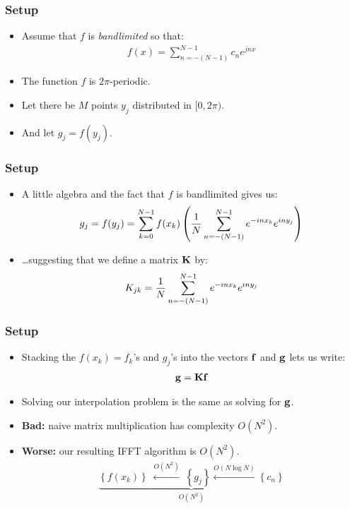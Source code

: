 \documentclass{beamer}
\newcommand{\parens}[1]{\left(#1\right)}
\newcommand{\set}[1]{\left\{#1\right\}}
\begin{document}
\begin{frame}
  \frametitle{Setup}
  \begin{itemize}
  \item Assume that $f$ is \emph{bandlimited} so that:
    \begin{align*}
      f(x) = \sum_{n=-(N-1)}^{N-1} c_n e^{jnx}
    \end{align*}
  \item The function $f$ is $2\pi$-periodic.
  \item Let there be $M$ points $y_j$ distributed in $[0, 2\pi)$.
  \item And let $g_j = f(y_j)$.
  \end{itemize}
\end{frame}

\begin{frame}
  \frametitle{Setup}
  \begin{itemize}
  \item A little algebra and the fact that $f$ is bandlimited gives us:
    \begin{align*}
      g_j = f(y_j) = \sum_{k=0}^{N-1} f(x_k) \parens{{1 \over N} \sum_{n=-(N-1)}^{N-1} e^{-inx_k} e^{iny_j}}
    \end{align*}
    \pause
  \item \ldots suggesting that we define a matrix $\bold{K}$ by:
    \begin{align*}
      K_{jk} = {1 \over N} \sum_{n=-(N-1)}^{N-1} e^{-inx_k} e^{iny_j}
    \end{align*}
  \end{itemize}
\end{frame}

\begin{frame}
  \frametitle{Setup}
  \begin{itemize}
  \item Stacking the $f(x_k) = f_k$'s
    and $g_j$'s into the vectors $\bold{f}$ and $\bold{g}$ lets us write:
    \begin{align*}
      \bold{g} = \bold{K} \bold{f}
    \end{align*}
  \item Solving our interpolation problem is the same as solving for
    $\bold{g}$.
    \pause
  \item \textbf{Bad:} naive matrix multiplication has complexity $O(N^2)$.
    \pause
  \item \textbf{Worse:} our resulting IFFT algorithm is $O(N^2)$.
    \begin{align*}
      \underbrace{\set{f(x_k)} \; \overset{O(N^2)}{\longleftarrow} \; \set{g_j} \overset{O(N \log N)}{\longleftarrow} \set{c_n}}_{O(N^2)}
    \end{align*}
  \end{itemize}
\end{frame}
\end{document}
